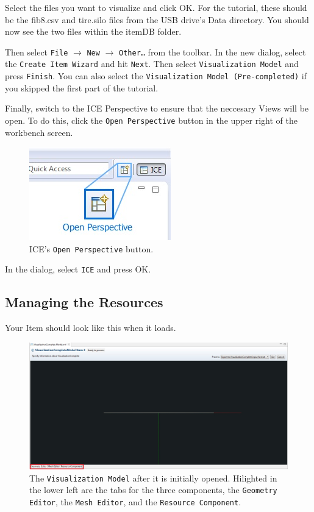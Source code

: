 Select the files you want to visualize and click OK. For the tutorial, these
should be the fib8.csv and tire.silo files from the USB drive's Data directory.
You should now see the two files within the itemDB folder.

Then select \texttt{File} $\rightarrow$ \texttt{New} $\rightarrow$
\texttt{Other\ldots} from the toolbar.
In the new dialog, select the \texttt{Create Item Wizard} and hit \texttt{Next}.
Then select \texttt{Visualization Model} and press \texttt{Finish}. You can also select the
\texttt{Visualization Model (Pre-completed)} if you skipped the first part of
the tutorial.

Finally, switch to the ICE Perspective to ensure that the neccesary Views will
be open. To do this, click the \texttt{Open Perspective} button in the upper right
of the workbench screen.

\begin{figure}[!h]
\includegraphics{images/ICE_OpenPerspective}
\centering
\caption{ICE's \texttt{Open Perspective} button.}
\label{fig:openpersepctive}
\end{figure}

In the dialog, select \texttt{ICE} and press {OK}.

\subsection{Managing the Resources}

Your Item should look like this when it loads.

\begin{figure}[!h]
\includegraphics[width=12cm]{images/ItemTabs}
\centering
\caption{The \texttt{Visualization Model} after it is initially opened.
Hilighted in the lower left are the tabs for the three components, the
\texttt{Geometry Editor}, the \texttt{Mesh Editor}, and the \texttt{Resource
Component}.}
\label{fig:itemtabs}
\end{figure}

